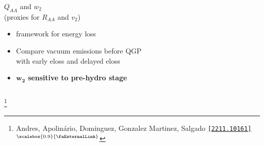 \documentclass[aspectratio=169,11pt,usenames,dvipsnames]{beamer}
\renewcommand{\thefootnote}{\color{customblue}\faPaperPlaneO}
\newcommand\blfootnote[1]{%
  \begingroup
  \renewcommand\thefootnote{}\footnote{#1}%
  \addtocounter{footnote}{-1}%
  \endgroup
}
\begin{document}
\begin{frame}[t,noframenumbering]
\begin{columns}[onlytextwidth,t]
\begin{center}
            {\Large\color{isgold} $Q_{AA}$ and $w_2$\\{\scriptsize (proxies for $R_{AA}$ and $v_2$)} \\[10pt]}
            \footnotesize
                \begin{itemize}
                    \item {\color{lightgray}{\bfseries BDMPS-Z} framework for energy loss}
                    \item {\color{lightgray}Compare {\color{Red}vacuum emissions before QGP}\\ with {\color{OliveGreen}early eloss} and {\color{RoyalBlue}delayed eloss}}
                    \\[15pt]
                    \item {\color{destacado}\bfseries\normalsize{$\boldsymbol{w_2}$ sensitive to pre-hydro stage}}
                \end{itemize}
        \end{center}
    \end{columns}
    \blfootnote{\scriptsize Andres, Apolinário, Dominguez, Gonzalez Martinez, Salgado \href{https://arxiv.org/abs/2211.10161}{\color{palgold}\texttt{[2211.10161]}$^\text{\scalebox{0.9}{\faExternalLink}}$}}
\end{frame}



\end{document}
